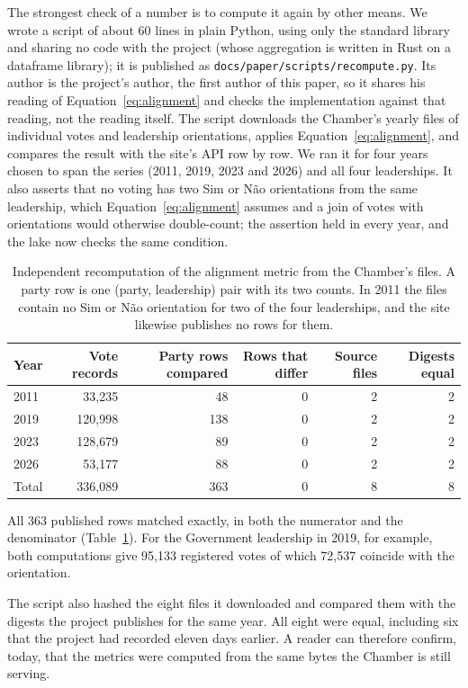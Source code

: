 The strongest check of a number is to compute it again by other means. We wrote a script of about 60 lines in plain Python, using only the standard library and sharing no code with the project (whose aggregation is written in Rust on a dataframe library); it is published as \texttt{docs/paper/scripts/recompute.py}. Its author is the project's author, the first author of this paper, so it shares his reading of Equation~\ref{eq:alignment} and checks the implementation against that reading, not the reading itself. The script downloads the Chamber's yearly files of individual votes and leadership orientations, applies Equation~\ref{eq:alignment}, and compares the result with the site's API row by row. We ran it for four years chosen to span the series (2011, 2019, 2023 and 2026) and all four leaderships. It also asserts that no voting has two Sim or N\~ao orientations from the same leadership, which Equation~\ref{eq:alignment} assumes and a join of votes with orientations would otherwise double-count; the assertion held in every year, and the lake now checks the same condition.

\begin{table}[t]
\centering
\small
\begin{tabular}{@{}lrrrrr@{}}
\toprule
Year & Vote records & Party rows compared & Rows that differ & Source files & Digests equal \\
\midrule
2011 & 33,235  & 48  & 0 & 2 & 2 \\
2019 & 120,998 & 138 & 0 & 2 & 2 \\
2023 & 128,679 & 89  & 0 & 2 & 2 \\
2026 & 53,177  & 88  & 0 & 2 & 2 \\
\midrule
Total & 336,089 & 363 & 0 & 8 & 8 \\
\bottomrule
\end{tabular}
\caption{Independent recomputation of the alignment metric from the Chamber's files. A party row is one (party, leadership) pair with its two counts. In 2011 the files contain no Sim or N\~ao orientation for two of the four leaderships, and the site likewise publishes no rows for them.}
\label{tab:recompute}
\end{table}

All 363 published rows matched exactly, in both the numerator and the denominator (Table~\ref{tab:recompute}). For the Government leadership in 2019, for example, both computations give 95,133 registered votes of which 72,537 coincide with the orientation.

The script also hashed the eight files it downloaded and compared them with the digests the project publishes for the same year. All eight were equal, including six that the project had recorded eleven days earlier. A reader can therefore confirm, today, that the metrics were computed from the same bytes the Chamber is still serving.

